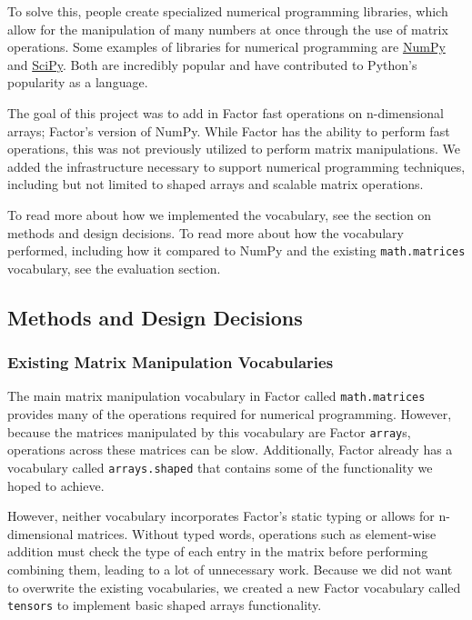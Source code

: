 \documentclass[
]{article}
\begin{document}
To solve this, people create specialized numerical programming
libraries, which allow for the manipulation of many numbers at once
through the use of matrix operations. Some examples of libraries for
numerical programming are \href{https://numpy.org/}{NumPy} and
\href{https://www.scipy.org/}{SciPy}. Both are incredibly popular and
have contributed to Python's popularity as a language.

The goal of this project was to add in Factor fast operations on
n-dimensional arrays; Factor's version of NumPy. While Factor has the
ability to perform fast operations, this was not previously utilized to
perform matrix manipulations. We added the infrastructure necessary to
support numerical programming techniques, including but not limited to
shaped arrays and scalable matrix operations.

To read more about how we implemented the vocabulary, see the section on
methods and design decisions. To read more about how the vocabulary
performed, including how it compared to NumPy and the existing
\texttt{math.matrices} vocabulary, see the evaluation section.

\hypertarget{methods-and-design-decisions}{%
\subsection{Methods and Design
Decisions}\label{methods-and-design-decisions}}

\hypertarget{existing-matrix-manipulation-vocabularies}{%
\subsubsection{Existing Matrix Manipulation
Vocabularies}\label{existing-matrix-manipulation-vocabularies}}

The main matrix manipulation vocabulary in Factor called
\texttt{math.matrices} provides many of the operations required for
numerical programming. However, because the matrices manipulated by this
vocabulary are Factor \texttt{array}s, operations across these matrices
can be slow. Additionally, Factor already has a vocabulary called
\texttt{arrays.shaped} that contains some of the functionality we hoped
to achieve.

However, neither vocabulary incorporates Factor's static typing or
allows for n-dimensional matrices. Without typed words, operations such
as element-wise addition must check the type of each entry in the matrix
before performing combining them, leading to a lot of unnecessary work.
Because we did not want to overwrite the existing vocabularies, we
created a new Factor vocabulary called \texttt{tensors} to implement
basic shaped arrays functionality.
\end{document}
